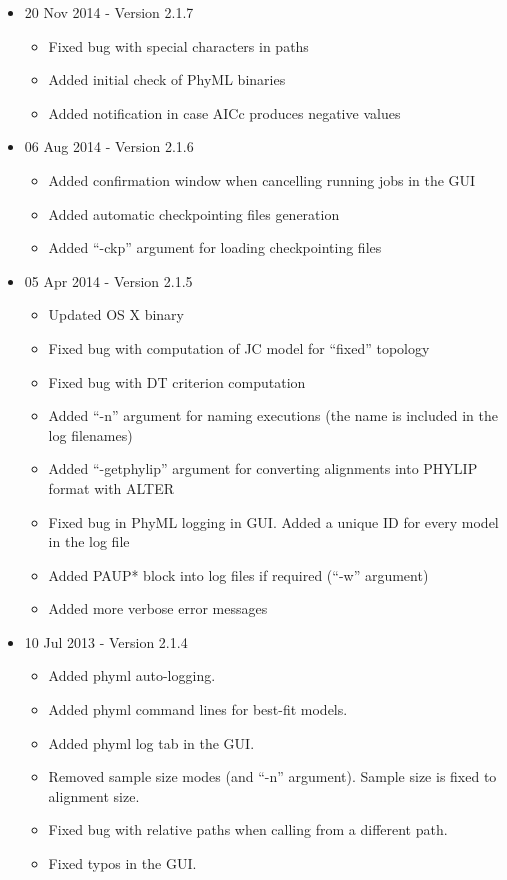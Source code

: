 \documentclass[11pt,twoside,a4paper]{article}
\begin{document}
\begin{itemize}

	\item 20 Nov 2014 - Version 2.1.7

	\begin{itemize}
		\item Fixed bug with special characters in paths
		\item Added initial check of PhyML binaries
		\item Added notification in case AICc produces negative values
	\end{itemize}

	\item 06 Aug 2014 - Version 2.1.6

	\begin{itemize}
		\item Added confirmation window when cancelling running jobs in the GUI
		\item Added automatic checkpointing files generation
		\item Added ``-ckp'' argument for loading checkpointing files
	\end{itemize}

	\item 05 Apr 2014 - Version 2.1.5

	\begin{itemize}
		\item Updated OS X binary
		\item Fixed bug with computation of JC model for ``fixed'' topology
		\item Fixed bug with DT criterion computation
		\item Added ``-n'' argument for naming executions (the name is included in the log filenames)
		\item Added ``-getphylip'' argument for converting alignments into PHYLIP format with ALTER
		\item Fixed bug in PhyML logging in GUI. Added a unique ID for every model in the log file
		\item Added PAUP* block into log files if required (``-w'' argument)
		\item Added more verbose error messages 
	\end{itemize}

	\item 10 Jul 2013 - Version 2.1.4

	\begin{itemize}
		\item Added phyml auto-logging.
		\item Added phyml command lines for best-fit models.
		\item Added phyml log tab in the GUI.
		\item Removed sample size modes (and ``-n'' argument). Sample size is fixed to alignment size.
		\item Fixed bug with relative paths when calling from a different path.
		\item Fixed typos in the GUI. 
	\end{itemize}


\end{itemize}
\end{document}
